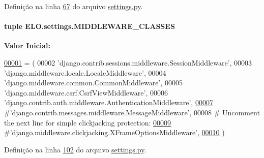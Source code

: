 Definição na linha \hyperlink{settings_8py_source_l00067}{67} do arquivo \hyperlink{settings_8py_source}{settings.\+py}.

\hypertarget{namespaceELO_1_1settings_a968380d6242dca6cc82acb1d806c703d}{}
\paragraph[{M\+I\+D\+D\+L\+E\+W\+A\+R\+E\+\_\+\+C\+L\+A\+S\+S\+E\+S}]{\setlength{\rightskip}{0pt plus 5cm}tuple E\+L\+O.\+settings.\+M\+I\+D\+D\+L\+E\+W\+A\+R\+E\+\_\+\+C\+L\+A\+S\+S\+E\+S}\label{namespaceELO_1_1settings_a968380d6242dca6cc82acb1d806c703d}
{\bfseries Valor Inicial\+:}
\begin{DoxyCode}
\hypertarget{namespaceELO_1_1settings_l00001}{}\hyperlink{namespaceELO_1_1settings}{00001} = (
00002     \textcolor{stringliteral}{'django.contrib.sessions.middleware.SessionMiddleware'},
00003     \textcolor{stringliteral}{'django.middleware.locale.LocaleMiddleware'},
00004     \textcolor{stringliteral}{'django.middleware.common.CommonMiddleware'},
00005     \textcolor{stringliteral}{'django.middleware.csrf.CsrfViewMiddleware'},
00006     \textcolor{stringliteral}{'django.contrib.auth.middleware.AuthenticationMiddleware'},
\hypertarget{namespaceELO_1_1settings_l00007}{}\hyperlink{namespaceELO_1_1settings_a7730264ddd478343e0f282f36d4a5ab4}{00007}     \textcolor{comment}{#'django.contrib.messages.middleware.MessageMiddleware',}
00008     \textcolor{comment}{# Uncomment the next line for simple clickjacking protection:}
\hypertarget{namespaceELO_1_1settings_l00009}{}\hyperlink{namespaceELO_1_1settings_a62f457ac29cc6f3e85282c71ce3b4f26}{00009}     \textcolor{comment}{#'django.middleware.clickjacking.XFrameOptionsMiddleware',}
\hypertarget{namespaceELO_1_1settings_l00010}{}\hyperlink{namespaceELO_1_1settings_a014930e0bf77feccc65c20212593381e}{00010} )
\end{DoxyCode}


Definição na linha \hyperlink{settings_8py_source_l00102}{102} do arquivo \hyperlink{settings_8py_source}{settings.\+py}.

\hypertarget{namespaceELO_1_1settings_a9c32eb39b369ab243858f8bd495e698b}{}
